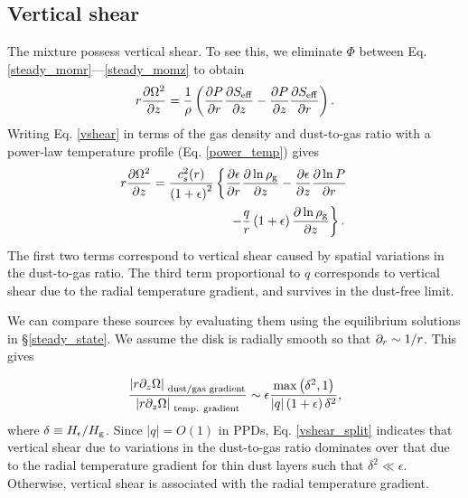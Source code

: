 \subsection{Vertical shear}\label{vertshear}
The mixture possess vertical shear. To see this, we eliminate $\Phi$
between Eq. \ref{steady_momr}---\ref{steady_momz} to 
obtain 
\begin{align}\label{vshear}
  r\frac{\partial \Omega^2}{\partial z} 
   = \frac{1}{\rho}\left(\frac{\partial P}{\partial r}\frac{\partial S_\mathrm{eff}}{\partial z} -\frac{\partial
    P}{\partial z}\frac{\partial S_\mathrm{eff}}{\partial r} \right). 
\end{align}
Writing Eq. \ref{vshear} in terms of the gas density and dust-to-gas
ratio with a power-law temperature profile (Eq. \ref{power_temp}) gives 
\begin{align}\label{vshear2}
  &r\frac{\p \Omega^2}{\p z}  =
  \frac{c_s^2(r)}{\left(1+\epsilon\right)^2}\left\{
  \frac{\p\epsilon}{\p r}\frac{\p\ln{\rhog}}{\p z}
 -\frac{\p\epsilon}{\p z}\frac{\p\ln{P}}{\p r}\right.\notag\\
  &\phantom{ r\frac{\p \Omega^2}{\p z}  =
    \frac{c_s^2(r)}{\left(1+\epsilon\right)^2}\left\{\right\} }
  \left. -\frac{q}{r} \left(1+\epsilon\right)\frac{\p\ln{\rhog}}{\p z}
  \right\}. 
\end{align}
The first two terms correspond to vertical shear caused by spatial
variations in the dust-to-gas ratio. The third term
proportional to $q$ corresponds to vertical shear due to the 
radial temperature gradient, and survives in the dust-free limit. 

We can compare these sources by 
evaluating them using the equilibrium
solutions in \S\ref{steady_state}. We assume the disk is radially
smooth so that $\partial_r\sim 1/r$. %
This gives 

\begin{align}\label{vshear_split}
  \frac{\left|r\partial_z\Omega\right|_{\text{
        dust/gas gradient}}}{\left|r\partial_z\Omega\right|_{\text{
        temp. gradient}}} \sim
 \epsilon \frac{\mathrm{max}\left(\delta^2,
    1\right)}{\left|q\right|\left(1+\epsilon\right)\delta^2},
\end{align}
where $\delta\equiv H_\epsilon/H_\mathrm{g}$. 
Since $|q|=O(1)$ in PPDs, Eq. \ref{vshear_split} indicates that
vertical shear due to variations in the dust-to-gas ratio dominates 
over that due to the radial temperature gradient for thin dust layers
such that $\delta^2\ll \epsilon$. Otherwise, vertical shear is
associated with the radial temperature gradient. %

